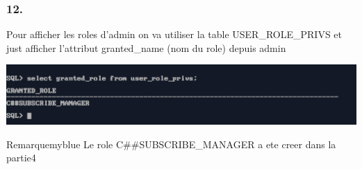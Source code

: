 \subsubsection*{12.}
Pour afficher les roles d'admin on va utiliser la table USER\_ROLE\_PRIVS et just afficher 
l'attribut granted\_name (nom du role) depuis admin



\begin{center}
    \includegraphics[width=\textwidth]{ScreenShot/Partie5/role.png}
\end{center}

\begin{prettyBox}{Remarque}{myblue}
Le role C\#\#SUBSCRIBE\_MANAGER a ete creer dans la partie4
\end{prettyBox}
